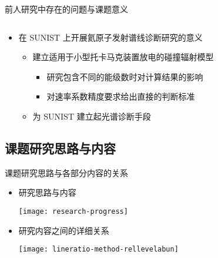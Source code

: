\begin{frame}{前人研究中存在的问题与课题意义}
\begin{columns}
	\end{columns}
	\vspace{-1.2em}
	\begin{itemize}
		\item 在 SUNIST 上开展氦原子发射谱线诊断研究的意义
			\begin{itemize}
				\item 建立适用于小型托卡马克装置放电的碰撞辐射模型
					\begin{itemize}
						\item 研究包含不同的能级数时对计算结果的影响
						\item 对速率系数精度要求给出直接的判断标准
					\end{itemize}
				\item 为 SUNIST 建立起光谱诊断手段%
			\end{itemize}
	\end{itemize}
\end{frame}

\subsection{课题研究思路与内容}

\begin{frame}{课题研究思路与各部分内容的关系}
	\begin{itemize}
		\item 研究思路与内容\\
			\begin{center}
			\texttt{[image: research-progress]}
			\end{center}
		\item 研究内容之间的详细关系\\
			\begin{center}
			\texttt{[image: lineratio-method-rellevelabun]}
			\end{center}
	\end{itemize}
\end{frame}


